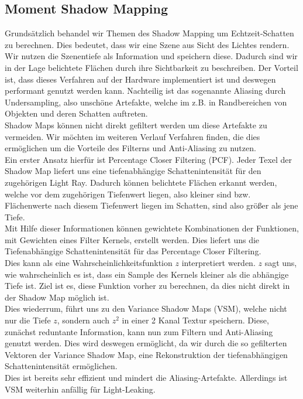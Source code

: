 \documentclass[runningheaders,a4paper]{llncs}
\begin{document}
\subsection{Moment Shadow Mapping}
Grundsätzlich behandel wir Themen des Shadow Mapping um Echtzeit-Schatten zu berechnen. Dies bedeutet, dass wir eine Szene aus Sicht des Lichtes rendern. Wir nutzen die Szenentiefe als Information und speichern diese. Dadurch sind wir in der Lage belichtete Flächen durch ihre Sichtbarkeit zu beschreiben. Der Vorteil ist, dass dieses Verfahren auf der Hardware implementiert ist und deswegen performant genutzt werden kann. Nachteilig ist das sogenannte Aliasing durch Undersampling, also unschöne Artefakte, welche im z.B. in Randbereichen von Objekten und deren Schatten auftreten.\\
Shadow Maps können nicht direkt gefiltert werden um diese Artefakte zu vermeiden. Wir möchten im weiteren Verlauf Verfahren finden, die dies ermöglichen um die Vorteile des Filterns und Anti-Aliasing zu nutzen.\\
Ein erster Ansatz hierfür ist Percentage Closer Filtering (PCF). Jeder Texel der Shadow Map liefert uns eine tiefenabhängige Schattenintensität für den zugehörigen Light Ray. Dadurch können belichtete Flächen erkannt werden, welche vor dem zugehörigen Tiefenwert liegen, also kleiner sind bzw. Flächenwerte nach diesem Tiefenwert liegen im Schatten, sind also größer als jene Tiefe.\\
Mit Hilfe dieser Informationen können gewichtete Kombinationen der Funktionen, mit Gewichten eines Filter Kernels, erstellt werden. Dies liefert uns die Tiefenabhängige Schattenintensität für das Percentage Closer Filtering. \cite{reeves1987rendering}\\
Dies kann als eine Wahrscheinlichkeitsfunktion $z$ interpretiert werden. $z$ sagt uns, wie wahrscheinlich es ist, dass ein Sample des Kernels kleiner als die abhängige Tiefe ist. Ziel ist es, diese Funktion vorher zu berechnen, da dies nicht direkt in der Shadow Map möglich ist.\\
Dies wiederrum, führt uns zu den Variance Shadow Maps (VSM), welche nicht nur die Tiefe $z$, sondern auch $z^2$ in einer 2 Kanal Textur speichern. Diese, zunächst reduntante Information, kann nun zum Filtern und Anti-Aliasing genutzt werden. Dies wird deswegen ermöglicht, da wir durch die so gefilterten Vektoren der Variance Shadow Map, eine Rekonstruktion der tiefenabhängigen Schattenintensität ermöglichen.\cite{donnelly2006variance}\\ Dies ist bereits sehr effizient und mindert die Aliasing-Artefakte. Allerdings ist VSM weiterhin anfällig für Light-Leaking.\\
\end{document}
